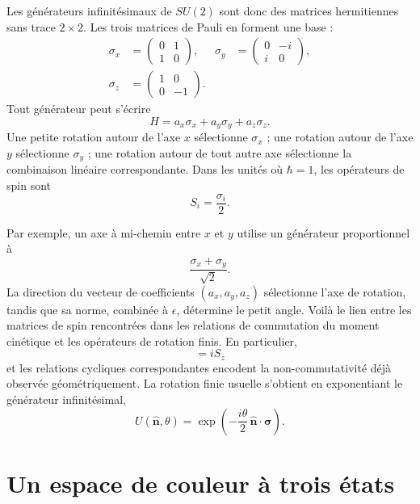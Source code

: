 Les générateurs infinitésimaux de \(SU(2)\) sont donc des matrices hermitiennes sans trace \(2\times2\). Les trois matrices de Pauli en forment une base :
\begin{equation}
\begin{aligned}
\sigma_x&=
\begin{pmatrix}0&1\\1&0\end{pmatrix},
&
\sigma_y&=
\begin{pmatrix}0&-i\\i&0\end{pmatrix},
\\[0.4em]
\sigma_z&=
\begin{pmatrix}1&0\\0&-1\end{pmatrix}.
\end{aligned}
\end{equation}
Tout générateur peut s’écrire
\begin{equation}
H=a_x\sigma_x+a_y\sigma_y+a_z\sigma_z.
\end{equation}
Une petite rotation autour de l’axe \(x\) sélectionne \(\sigma_x\) ; une rotation autour de l’axe \(y\) sélectionne \(\sigma_y\) ; une rotation autour de tout autre axe sélectionne la combinaison linéaire correspondante. Dans les unités où \(\hbar=1\), les opérateurs de spin sont
\begin{equation}
S_i=\frac{\sigma_i}{2}.
\end{equation}

Par exemple, un axe à mi-chemin entre \(x\) et \(y\) utilise un générateur proportionnel à
\begin{equation}
\frac{\sigma_x+\sigma_y}{\sqrt2}.
\end{equation}
La direction du vecteur de coefficients \((a_x,a_y,a_z)\) sélectionne l’axe de rotation, tandis que sa norme, combinée à \(\epsilon\), détermine le petit angle. Voilà le lien entre les matrices de spin rencontrées dans les relations de commutation du moment cinétique et les opérateurs de rotation finis. En particulier,
\begin{equation}
[S_x,S_y]=iS_z
\end{equation}
et les relations cycliques correspondantes encodent la non-commutativité déjà observée géométriquement. La rotation finie usuelle s’obtient en exponentiant le générateur infinitésimal\editorialnote{},
\begin{equation}
U(\hat{\boldsymbol n},\theta)
=\exp\left(-\frac{i\theta}{2}\,
\hat{\boldsymbol n}\cdot\boldsymbol\sigma\right).
\end{equation}\section{Un espace de couleur à trois états}


